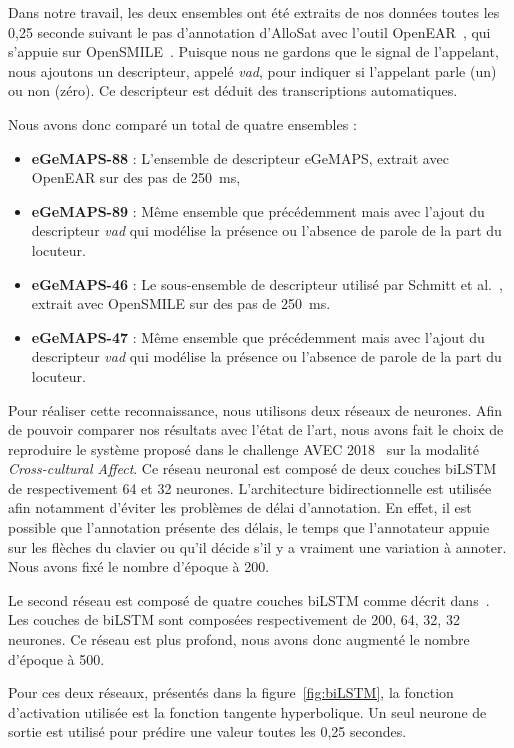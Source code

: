 Dans notre travail, les deux ensembles ont été extraits de nos données toutes les 0,25 seconde suivant le pas d'annotation d'AlloSat avec l'outil OpenEAR~\cite{OpenEAR}, qui s'appuie sur OpenSMILE~\cite{OPENSMILE}. Puisque nous ne gardons que le signal de l'appelant, nous ajoutons un descripteur, appelé \textit{vad}, pour indiquer si l'appelant parle (un) ou non (zéro). Ce descripteur est déduit des transcriptions automatiques.

Nous avons donc comparé un total de quatre ensembles :
\begin{itemize}
    \item \textbf{eGeMAPS-88} : L'ensemble de descripteur eGeMAPS, extrait avec OpenEAR sur des pas de 250~ms,
    \item \textbf{eGeMAPS-89} : Même ensemble que précédemment mais avec l'ajout du descripteur \textit{vad} qui modélise la présence ou l'absence de parole de la part du locuteur.
    \item \textbf{eGeMAPS-46} : Le sous-ensemble de descripteur utilisé par Schmitt et al.~\cite{Schmitt2019}, extrait avec OpenSMILE sur des pas de 250~ms.
    \item \textbf{eGeMAPS-47} : Même ensemble que précédemment mais avec l'ajout du descripteur \textit{vad} qui modélise la présence ou l'absence de parole de la part du locuteur.
\end{itemize}

Pour réaliser cette reconnaissance, nous utilisons deux réseaux de neurones. Afin de pouvoir comparer nos résultats avec l'état de l'art, nous avons fait le choix de reproduire le système proposé dans le challenge AVEC 2018~\cite{AVEC2018} sur la modalité \textit{Cross-cultural Affect}. Ce réseau neuronal est composé de deux couches biLSTM de respectivement 64 et 32 neurones. L'architecture bidirectionnelle est utilisée afin notamment d'éviter les problèmes de délai d'annotation. En effet, il est possible que l'annotation présente des délais, le temps que l'annotateur appuie sur les flèches du clavier ou qu'il décide s'il y a vraiment une variation à annoter. Nous avons fixé le nombre d'époque à 200.

Le second réseau est composé de quatre couches biLSTM comme décrit dans~\cite{Schmitt2019}. Les couches de biLSTM sont composées respectivement de 200, 64, 32, 32 neurones. Ce réseau est plus profond, nous avons donc augmenté le nombre d'époque à 500.

Pour ces deux réseaux, présentés dans la figure~\ref{fig:biLSTM}, la fonction d'activation utilisée est la fonction tangente hyperbolique. Un seul neurone de sortie est utilisé pour prédire une valeur toutes les 0,25 secondes.

